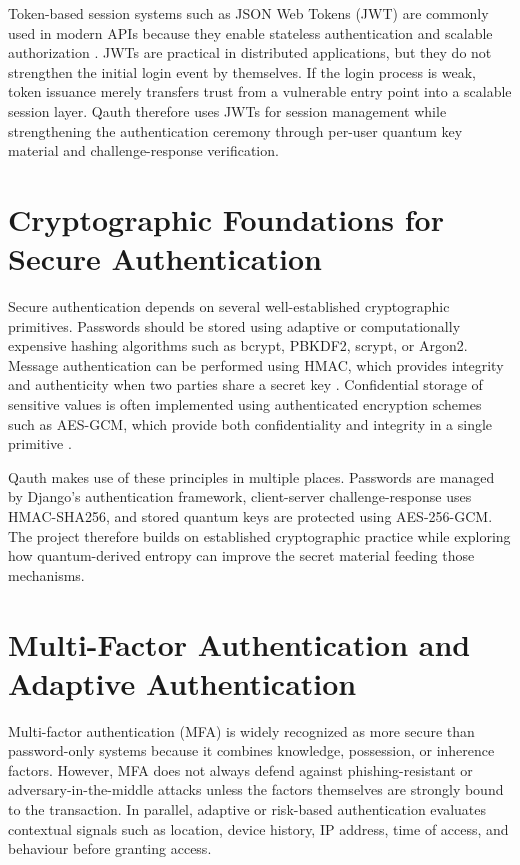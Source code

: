 Token-based session systems such as JSON Web Tokens (JWT) are commonly used in modern APIs because they enable stateless authentication and scalable authorization \cite{rfc7519}. JWTs are practical in distributed applications, but they do not strengthen the initial login event by themselves. If the login process is weak, token issuance merely transfers trust from a vulnerable entry point into a scalable session layer. Qauth therefore uses JWTs for session management while strengthening the authentication ceremony through per-user quantum key material and challenge-response verification.

\section{Cryptographic Foundations for Secure Authentication}
Secure authentication depends on several well-established cryptographic primitives. Passwords should be stored using adaptive or computationally expensive hashing algorithms such as bcrypt, PBKDF2, scrypt, or Argon2. Message authentication can be performed using HMAC, which provides integrity and authenticity when two parties share a secret key \cite{rfc2104}. Confidential storage of sensitive values is often implemented using authenticated encryption schemes such as AES-GCM, which provide both confidentiality and integrity in a single primitive \cite{nistgcm}.

Qauth makes use of these principles in multiple places. Passwords are managed by Django's authentication framework, client-server challenge-response uses HMAC-SHA256, and stored quantum keys are protected using AES-256-GCM. The project therefore builds on established cryptographic practice while exploring how quantum-derived entropy can improve the secret material feeding those mechanisms.

\section{Multi-Factor Authentication and Adaptive Authentication}
Multi-factor authentication (MFA) is widely recognized as more secure than password-only systems because it combines knowledge, possession, or inherence factors. However, MFA does not always defend against phishing-resistant or adversary-in-the-middle attacks unless the factors themselves are strongly bound to the transaction. In parallel, adaptive or risk-based authentication evaluates contextual signals such as location, device history, IP address, time of access, and behaviour before granting access.

